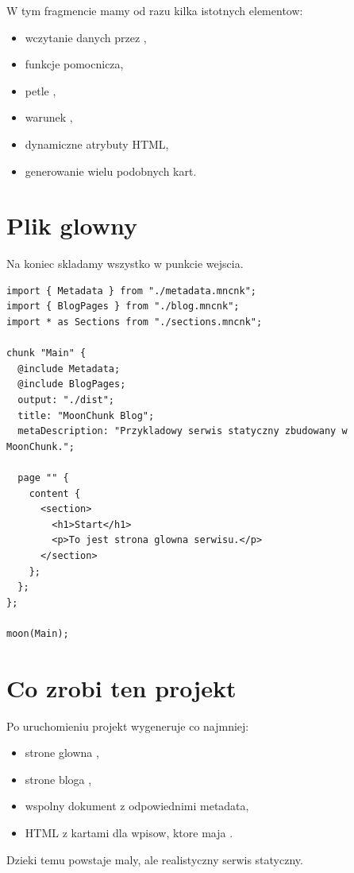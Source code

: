 W tym fragmencie mamy od razu kilka istotnych elementow:

\begin{itemize}
  \item wczytanie danych przez ,
  \item funkcje pomocnicza,
  \item petle ,
  \item warunek ,
  \item dynamiczne atrybuty HTML,
  \item generowanie wielu podobnych kart.
\end{itemize}

\section{Plik glowny}
Na koniec skladamy wszystko w punkcie wejscia.

\begin{lstlisting}[style=moonchunk,caption={Plik site.mncnk}]
import { Metadata } from "./metadata.mncnk";
import { BlogPages } from "./blog.mncnk";
import * as Sections from "./sections.mncnk";

chunk "Main" {
  @include Metadata;
  @include BlogPages;
  output: "./dist";
  title: "MoonChunk Blog";
  metaDescription: "Przykladowy serwis statyczny zbudowany w MoonChunk.";

  page "" {
    content {
      <section>
        <h1>Start</h1>
        <p>To jest strona glowna serwisu.</p>
      </section>
    };
  };
};

moon(Main);
\end{lstlisting}

\section{Co zrobi ten projekt}
Po uruchomieniu projekt wygeneruje co najmniej:

\begin{itemize}
  \item strone glowna ,
  \item strone bloga ,
  \item wspolny dokument z odpowiednimi metadata,
  \item HTML z kartami dla wpisow, ktore maja .
\end{itemize}

Dzieki temu powstaje maly, ale realistyczny serwis statyczny.

